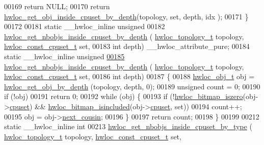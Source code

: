 \begin{DoxyCode}
00169     \textcolor{keywordflow}{return} NULL;
00170   \textcolor{keywordflow}{return} \hyperlink{a00195_gaec86f1f88832836e3f9338e246ea5862}{hwloc\_get\_obj\_inside\_cpuset\_by\_depth}(topology, \textcolor{keyword}{set}, depth, idx
      );
00171 \}
00172 
00181 \textcolor{keyword}{static} \_\_hwloc\_inline \textcolor{keywordtype}{unsigned}
00182 \hyperlink{a00195_gaa43c64512ddb33fd181990c4261cec7d}{hwloc\_get\_nbobjs\_inside\_cpuset\_by\_depth} (
      \hyperlink{a00186_ga9d1e76ee15a7dee158b786c30b6a6e38}{hwloc\_topology\_t} topology, \hyperlink{a00183_ga1f784433e9b606261f62d1134f6a3b25}{hwloc\_const\_cpuset\_t} \textcolor{keyword}{set},
00183                                          \textcolor{keywordtype}{int} depth) \_\_hwloc\_attribute\_pure;
00184 \textcolor{keyword}{static} \_\_hwloc\_inline \textcolor{keywordtype}{unsigned}
\hyperlink{a00195_gaa43c64512ddb33fd181990c4261cec7d}{00185} \hyperlink{a00195_gaa43c64512ddb33fd181990c4261cec7d}{hwloc\_get\_nbobjs\_inside\_cpuset\_by\_depth} (
      \hyperlink{a00186_ga9d1e76ee15a7dee158b786c30b6a6e38}{hwloc\_topology\_t} topology, \hyperlink{a00183_ga1f784433e9b606261f62d1134f6a3b25}{hwloc\_const\_cpuset\_t} \textcolor{keyword}{set},
00186                                          \textcolor{keywordtype}{int} depth)
00187 \{
00188   \hyperlink{a00238}{hwloc\_obj\_t} obj = \hyperlink{a00187_ga391f6b2613f0065673eaa4069b93d4e0}{hwloc\_get\_obj\_by\_depth} (topology, depth, 0);
00189   \textcolor{keywordtype}{unsigned} count = 0;
00190   \textcolor{keywordflow}{if} (!obj)
00191     \textcolor{keywordflow}{return} 0;
00192   \textcolor{keywordflow}{while} (obj) \{
00193     \textcolor{keywordflow}{if} (!\hyperlink{a00205_ga5b64be28f5a7176ed8ad0d6a90bdf108}{hwloc\_bitmap\_iszero}(obj->\hyperlink{a00238_a67925e0f2c47f50408fbdb9bddd0790f}{cpuset}) && 
      \hyperlink{a00205_ga0526e03db81956fb02acc8260b66d6a4}{hwloc\_bitmap\_isincluded}(obj->\hyperlink{a00238_a67925e0f2c47f50408fbdb9bddd0790f}{cpuset}, \textcolor{keyword}{set}))
00194       count++;
00195     obj = obj->\hyperlink{a00238_a85a788017457129589318b6c39451acf}{next\_cousin};
00196   \}
00197   \textcolor{keywordflow}{return} count;
00198 \}
00199 
00212 \textcolor{keyword}{static} \_\_hwloc\_inline \textcolor{keywordtype}{int}
00213 \hyperlink{a00195_ga133c40415de008518608f8bff52a5ab9}{hwloc\_get\_nbobjs\_inside\_cpuset\_by\_type} (
      \hyperlink{a00186_ga9d1e76ee15a7dee158b786c30b6a6e38}{hwloc\_topology\_t} topology, \hyperlink{a00183_ga1f784433e9b606261f62d1134f6a3b25}{hwloc\_const\_cpuset\_t} \textcolor{keyword}{set},

\end{DoxyCode}
